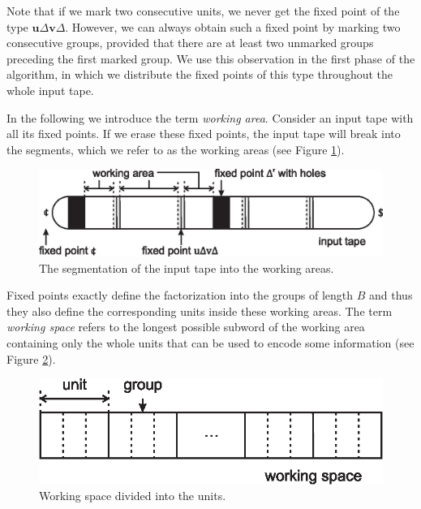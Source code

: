 Note that if we mark two consecutive units, we never get the fixed point of the type $\mathbf{u} \Delta \mathbf{v} \Delta$. However, we can always obtain such a fixed point by marking two consecutive groups, provided that there are at least two unmarked groups preceding the first marked group. We use this observation in the first phase of the algorithm, in which we distribute the fixed points of this type throughout the whole input tape.

In the following we introduce the term \emph{working area}. Consider an input tape with all its fixed points. If we erase these fixed points, the input tape will break into the segments, which we refer to as the working areas (see Figure \ref{figure:tape}).

\begin{figure}[htp]
\centering
\includegraphics[scale=1.0]{tape.eps}
\caption[The segmentation of the input tape into the working areas.]
{The segmentation of the input tape into the working areas.}
\label{figure:tape}
\end{figure}

Fixed points exactly define the factorization into the groups of length $B$ and thus they also define the corresponding units inside these working areas. The term \emph{working space} refers to the longest possible subword of the working area containing only the whole units that can be used to encode some information (see Figure \ref{figure:working_space}).

\begin{figure}[htp]
\centering
\includegraphics[scale=1.0]{working_space.eps}
\caption[Working space divided into the units.]
{Working space divided into the units.}
\label{figure:working_space}
\end{figure}

